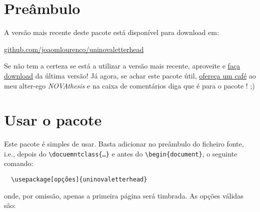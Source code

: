 \documentclass[a4paper,11pt]{article}
\title{\theTitle}
\author{\theAuthor}
\date{\uninovadate\ \ (v.\ \uninovaversion)}
\newcommand*{\thePackage}{\texttt{\uninovaletterheadname}}
\begin{document}
\maketitle


\begin{abstract}
    Este documento é simultaneamente um manual de instruções e um exemplo de como usar o pacote “\thePackage”.  Este pacote permite produzir documentos em \emph{papel timbrado} do \href{www.uninova.pt}{UNINOVA (Instituto de Desenvolvimento de Novas Tecnologias)}.
\end{abstract}


\section{Preâmbulo}

A versão mais recente deste pacote está disponível para download em:

\begin{center}
  \url{github.com/joaomlourenco/uninovaletterhead}
\end{center}

Se não tem a certeza se está a utilizar a versão mais recente, aproveite e \href{github.com/joaomlourenco/uninovaletterhead/archive/refs/heads/main.zip}{faça download} da última versão!   Já agora, se achar este pacote útil, \href{www.paypal.com/donate/?hosted_button_id=8WA8FRVMB78W8}{ofereça um café} ao meu alter-ego \emph{NOVAthesis} e na caixa de comentários diga que é para o pacote \thePackage! ;)


\section{Usar o pacote \thePackage}

Este pacote \thePackage é simples de usar.  Basta adicionar no preâmbulo do ficheiro fonte, i.e., depois do \verb!\docuemntclass{…}! e antes do \verb!\begin{document}!, o seguinte comando:

\begin{verbatim}
  \usepackage[opções]{uninovaletterhead}
\end{verbatim}

\noindent onde, por omissão, apenas a primeira página será timbrada.
As opções válidas são:\vspace{-1.5ex}
\end{document}
